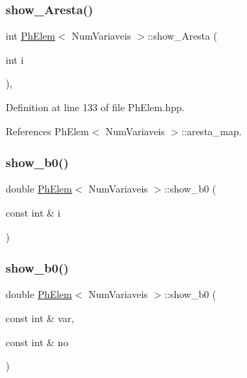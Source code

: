 \subsubsection{\texorpdfstring{show\+\_\+\+Aresta()}{show\_Aresta()}}
{\footnotesize\ttfamily int \hyperlink{classPhElem}{Ph\+Elem}$<$ Num\+Variaveis $>$\+::show\+\_\+\+Aresta (\begin{DoxyParamCaption}\item[{int}]{i }\end{DoxyParamCaption})\hspace{0.3cm}{\ttfamily [inline]}, {\ttfamily [inherited]}}



Definition at line 133 of file Ph\+Elem.\+hpp.



References Ph\+Elem$<$ Num\+Variaveis $>$\+::aresta\+\_\+map.

\mbox{\label{classPhElem_a0caf55d9fac7477102ee34373c67a024}} 
\subsubsection{\texorpdfstring{show\+\_\+b0()}{show\_b0()}\hspace{0.1cm}{\footnotesize\ttfamily [1/2]}}
{\footnotesize\ttfamily double \hyperlink{classPhElem}{Ph\+Elem}$<$ Num\+Variaveis $>$\+::show\+\_\+b0 (\begin{DoxyParamCaption}\item[{const int \&}]{i }\end{DoxyParamCaption})\hspace{0.3cm}{\ttfamily [inherited]}}

\mbox{\label{classPhElem_afb4171c67795f5614d9628d59f3bfaf7}} 
\subsubsection{\texorpdfstring{show\+\_\+b0()}{show\_b0()}\hspace{0.1cm}{\footnotesize\ttfamily [2/2]}}
{\footnotesize\ttfamily double \hyperlink{classPhElem}{Ph\+Elem}$<$ Num\+Variaveis $>$\+::show\+\_\+b0 (\begin{DoxyParamCaption}\item[{const int \&}]{var,  }\item[{const int \&}]{no }\end{DoxyParamCaption})\hspace{0.3cm}{\ttfamily [inherited]}}



